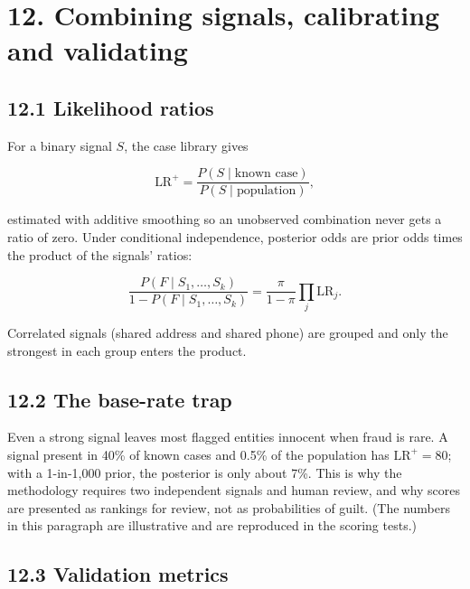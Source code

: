 \documentclass[letterpaper,11pt]{article}
\begin{document}
\hypertarget{combining-signals-calibrating-and-validating}{%
\section*{12. Combining signals, calibrating and
validating}\label{combining-signals-calibrating-and-validating}}

\hypertarget{likelihood-ratios}{%
\subsection*{12.1 Likelihood ratios}\label{likelihood-ratios}}

For a binary signal \(S\), the case library gives

\[\text{LR}^{+} = \frac{P(S \mid \text{known case})}{P(S \mid \text{population})},\]

estimated with additive smoothing so an unobserved combination never
gets a ratio of zero. Under conditional independence, posterior odds are
prior odds times the product of the signals' ratios:

\[\frac{P(F \mid S_1, \dots, S_k)}{1 - P(F \mid S_1, \dots, S_k)} = \frac{\pi}{1 - \pi}\prod_{j} \text{LR}_j.\]

Correlated signals (shared address and shared phone) are grouped and
only the strongest in each group enters the product.

\hypertarget{the-base-rate-trap}{%
\subsection*{12.2 The base-rate trap}\label{the-base-rate-trap}}

Even a strong signal leaves most flagged entities innocent when fraud is
rare. A signal present in 40\% of known cases and 0.5\% of the
population has \(\text{LR}^{+} = 80\); with a 1-in-1,000 prior, the
posterior is only about 7\%. This is why the methodology requires two
independent signals and human review, and why scores are presented as
rankings for review, not as probabilities of guilt. (The numbers in this
paragraph are illustrative and are reproduced in the scoring tests.)

\hypertarget{validation-metrics}{%
\subsection*{12.3 Validation metrics}\label{validation-metrics}}
\end{document}
